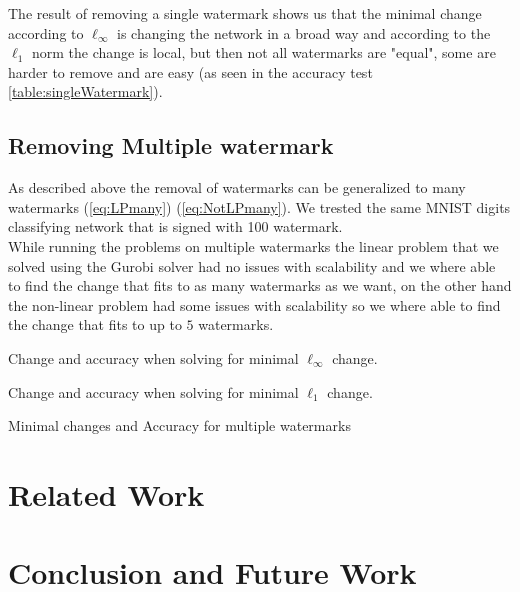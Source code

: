 \documentclass[a4paper]{easychair}
\begin{document}
The result of removing a single watermark shows us that the minimal change according to $\ell_\infty$ is changing the network in a broad way and according to the $\ell_1$ norm the change is local, but then not all watermarks are "equal", some are harder to remove and are easy (as seen in the accuracy test \ref{table:singleWatermark}).

\subsection{Removing Multiple watermark}

As described above the removal of watermarks can be generalized to many watermarks (\ref{eq:LPmany}) (\ref{eq:NotLPmany}). We trested the same MNIST digits classifying network that is signed with 100 watermark.
\\
While running the problems on multiple watermarks the linear problem that we solved using the Gurobi solver had no issues with scalability and we where able to find the change that fits to as many watermarks as we want, on the other hand the non-linear problem had some issues with scalability so we where able to find the change that fits to up to $5$ watermarks.

\begin{table}
\begin{subtable}{1\textwidth}
\centering
{}
\caption{Change and accuracy when solving for minimal $\ell_\infty$ change.}
\end{subtable}
\begin{subtable}{1\textwidth}
\centering
{}
\caption{Change and accuracy when solving for minimal $\ell_1$ change.}
\end{subtable}
\caption{Minimal changes and Accuracy for multiple watermarks}
\label{table:multipleWatermarks}
\end{table}


\section{Related Work}
\label{sec:relatedWork}

\section{Conclusion and Future Work}
\label{sec:conclusion}




\end{document}
